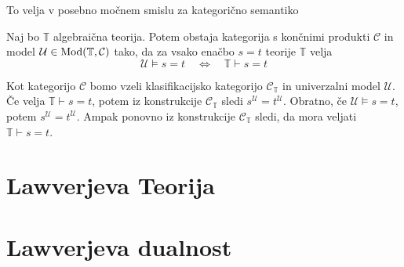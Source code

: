 \documentclass[../kategoricna_logika.tex]{subfiles}
\begin{document}
To velja v posebno močnem smislu za kategorično semantiko
\begin{izrek}
  Naj bo $\mathbb{T}$ algebraična teorija. Potem obstaja kategorija s
  končnimi produkti $\mathcal{C}$ in model
  $\mathcal{U} \in \operatorname{Mod}(\mathbb{T}, \mathcal{C})$ tako, da za vsako
  enačbo $s = t$ teorije $\mathbb{T}$ velja
$$\mathcal{U} \models s = t \quad \Longleftrightarrow \quad \mathbb{T} \vdash s = t$$
\end{izrek}
\begin{dokaz}
  Kot kategorijo $\mathcal{C}$ bomo vzeli klasifikacijsko kategorijo
  $\mathcal{C}_\mathbb{T}$ in univerzalni model $\mathcal{U}$. Če
  velja $\mathbb{T} \vdash s = t$, potem iz konstrukcije
  $\mathcal{C}_\mathbb{T}$ sledi $s^\mathcal{U} =
  t^\mathcal{U}$. Obratno, če $\mathcal{U} \models s = t$, potem
  $s^\mathcal{U} = t^\mathcal{U}$. Ampak ponovno iz konstrukcije
  $\mathcal{C}_\mathbb{T}$ sledi, da mora veljati
  $\mathbb{T} \vdash s = t$.
\end{dokaz}
%
%
\section{Lawverjeva Teorija}
%
\section{Lawverjeva dualnost}
\end{document}
